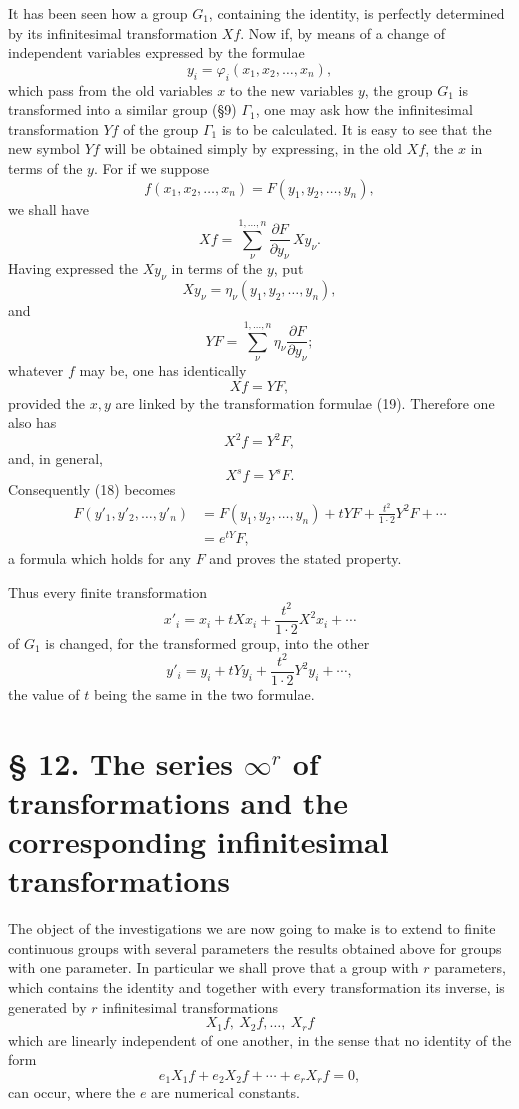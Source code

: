 \documentclass[11pt]{book}
\begin{document}
It has been seen how a group $G_1$, containing the identity, is perfectly determined by its infinitesimal transformation $Xf$. Now if, by means of a change of independent variables expressed by the formulae
\begin{equation*}\tag{19}
 y_i=\varphi_i(x_1,x_2,\ldots,x_n),
\end{equation*}
which pass from the old variables $x$ to the new variables $y$, the group $G_1$ is transformed into a similar group (\S{}9) $\Gamma_1$, one may ask how the infinitesimal transformation $Yf$ of the group $\Gamma_1$ is to be calculated. It is easy to see that the new symbol $Yf$ will be obtained simply by expressing, in the old $Xf$, the $x$ in terms of the $y$. For if we suppose
\[
 f(x_1,x_2,\ldots,x_n)=F(y_1,y_2,\ldots,y_n),
\]
we shall have
\[
 Xf=\sum\limits_\nu^{1,\ldots,n}\frac{\partial F}{\partial y_\nu}\,Xy_\nu.
\]
Having expressed the $Xy_\nu$ in terms of the $y$, put
\[
 Xy_\nu=\eta_\nu(y_1,y_2,\ldots,y_n),
\]
and
\[
 YF=\sum\limits_\nu^{1,\ldots,n}\eta_\nu\frac{\partial F}{\partial y_\nu};
\]
whatever $f$ may be, one has identically
\[
 Xf=YF,
\]
provided the $x,y$ are linked by the transformation formulae (19). Therefore one also has
\[
 X^2f=Y^2F,
\]
and, in general,
\[
 X^sf=Y^sF.
\]
Consequently (18) becomes
\[
\begin{aligned}
 F(y'_1,y'_2,\ldots,y'_n)&=F(y_1,y_2,\ldots,y_n)+tYF+\frac{t^2}{1\cdot2}Y^2F+\cdots\\
 &=e^{tY}F,
\end{aligned}
\]
a formula which holds for any $F$ and proves the stated property.

Thus every finite transformation
\[
 x'_i=x_i+tXx_i+\frac{t^2}{1\cdot2}X^2x_i+\cdots
\]
of $G_1$ is changed, for the transformed group, into the other
\[
 y'_i=y_i+tYy_i+\frac{t^2}{1\cdot2}Y^2y_i+\cdots,
\]
the value of $t$ being the same in the two formulae.

\section*{\S{} 12. The series $\infty^r$ of transformations and the corresponding infinitesimal transformations}

The object of the investigations we are now going to make is to extend to finite continuous groups with several parameters the results obtained above for groups with one parameter. In particular we shall prove that a group with $r$ parameters, which contains the identity and together with every transformation its inverse, is generated by $r$ infinitesimal transformations
\[
 X_1f,\ X_2f,\ldots,\ X_rf
\]
which are linearly independent of one another, in the sense that no identity of the form
\[
 e_1X_1f+e_2X_2f+\cdots+e_rX_rf=0,
\]
can occur, where the $e$ are numerical constants.
\end{document}
